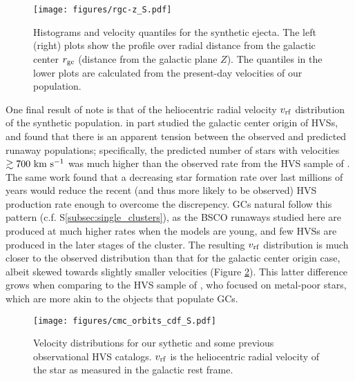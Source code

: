 \documentclass[twocolumn]{aastex631}
\begin{document}
\begin{figure*}
    \begin{centering}
        \texttt{[image: figures/rgc-z\_S.pdf]}
        \caption{
            Histograms and velocity quantiles for the synthetic ejecta.
            The left (right) plots show the profile over radial distance from the galactic center $r_{\rm gc}$ (distance from the galactic plane $Z$).
            The quantiles in the lower plots are calculated from the present-day velocities of our population.
        }
        \label{fig:rgc-z}
    \end{centering}
\end{figure*}

One final result of note is that of the heliocentric radial velocity $v_{\rm rf}$ distribution of the synthetic population.
\citet{2021arXiv211213864G} in part studied the galactic center origin of HVSs, and found that there is an apparent tension between the observed and predicted runaway populations; specifically, the predicted number of stars with velocities $\gtrsim 700~{\rm km~s^{-1}}$ was much higher than the observed rate from the HVS sample of \citet{2018ApJ...866...39B}.
The same work found that a decreasing star formation rate over last millions of years would reduce the recent (and thus more likely to be observed) HVS production rate enough to overcome the discrepency.
GCs natural follow this pattern (c.f. S\ref{subsec:single_clusters}), as the BSCO runaways studied here are produced at much higher rates when the models are young, and few HVSs are produced in the later stages of the cluster.
The resulting $v_{\rm rf}$ distribution is much closer to the observed distribution than that for the galactic center origin case, albeit skewed towards slightly smaller velocities (Figure \ref{fig:cmc_orbits_cdf}).
This latter difference grows when comparing to the HVS sample of \citet{2018ApJ...866..121H}, who focused on metal-poor stars, which are more akin to the objects that populate GCs.

\begin{figure}
    \begin{centering}
        \texttt{[image: figures/cmc\_orbits\_cdf\_S.pdf]}
        \caption{
            Velocity distributions for our sythetic and some previous observational HVS catalogs.
            $v_{\rm rf}$ is the heliocentric radial velocity of the star as measured in the galactic rest frame.
        }
        \label{fig:cmc_orbits_cdf}
    \end{centering}
\end{figure}
\end{document}
